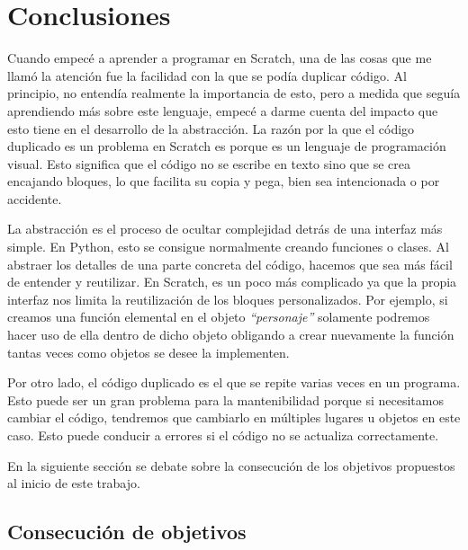 \documentclass[a4paper, 12pt]{book}
\begin{document}

\cleardoublepage
\chapter{Conclusiones}
\label{chap:conclusiones}

Cuando empecé a aprender a programar en Scratch, una de las cosas que me llamó la atención fue la facilidad con la que se podía duplicar código. Al principio, no entendía realmente la importancia de esto, pero a medida que seguía aprendiendo más sobre este lenguaje, empecé a darme cuenta del impacto que esto tiene en el desarrollo de la abstracción. La razón por la que el código duplicado es un problema en Scratch es porque es un lenguaje de programación visual. Esto significa que el código no se escribe en texto sino que se crea encajando bloques, lo que facilita su copia y pega, bien sea intencionada o por accidente.

La abstracción es el proceso de ocultar complejidad detrás de una interfaz más simple. En Python, esto se consigue normalmente creando funciones o clases. Al abstraer los detalles de una parte concreta del código, hacemos que sea más fácil de entender y reutilizar. En Scratch, es un poco más complicado ya que la propia interfaz nos limita la reutilización de los bloques personalizados. Por ejemplo, si creamos una función elemental en el objeto \textit{``personaje''} solamente podremos hacer uso de ella dentro de dicho objeto obligando a crear nuevamente la función tantas veces como objetos se desee la implementen.

Por otro lado, el código duplicado es el que se repite varias veces en un programa. Esto puede ser un gran problema para la mantenibilidad porque si necesitamos cambiar el código, tendremos que cambiarlo en múltiples lugares u objetos en este caso. Esto puede conducir a errores si el código no se actualiza correctamente.

En la siguiente sección se debate sobre la consecución de los objetivos propuestos al inicio de este trabajo. 

\section{Consecución de objetivos}
\label{sec:consecucion-objetivos}
\end{document}
